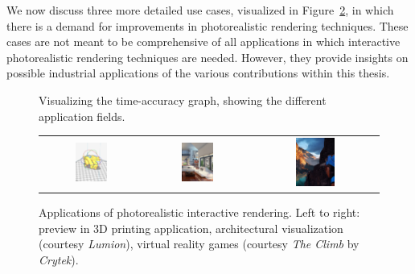 We now discuss three more detailed use cases, visualized in Figure~\ref{fig:applications}, in which there is a demand for improvements in photorealistic rendering techniques. These cases are not meant to be comprehensive of all applications in which interactive photorealistic rendering techniques are needed. However, they provide insights on possible industrial applications of the various contributions within this thesis.
%
\begin{figure}
\centering
\def\svgwidth{1.1\textwidth}

\caption{Visualizing the time-accuracy graph, showing the  different application fields.} 
\label{fig:main_diagram}
\end{figure}

\begin{figure}
\centering
\begin{tabular}{@{}c@{}c@{}c@{}}
	 \includegraphics[width=0.33\textwidth]{figures/3dprinting_preview_crop} & 	 \includegraphics[width=0.33\textwidth]{figures/lumion-crop.jpg} 
& 	 \includegraphics[width=0.33\textwidth]{figures/the-climb-crop.jpg} \\
\end{tabular}
\caption{Applications of photorealistic interactive rendering. Left to right: preview in 3D printing application, architectural visualization (courtesy \emph{Lumion}), virtual reality games (courtesy \emph{The Climb} by \emph{Crytek}).} 
\label{fig:applications}
\end{figure}
%
